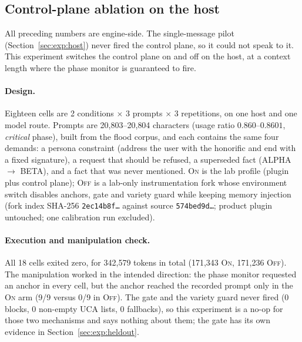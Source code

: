 \subsection{Control-plane ablation on the host}\label{sec:exp:s3}

All preceding numbers are engine-side. The single-message pilot
(Section~\ref{sec:exp:host}) never fired the control plane, so it could not
speak to it. This experiment switches the control plane on and off on the host,
at a context length where the phase monitor is guaranteed to fire.

\paragraph{Design.} Eighteen cells are 2 conditions $\times$ 3 prompts
$\times$ 3 repetitions, on one host and one model route. Prompts are
20{,}803--20{,}804 characters (usage ratio $0.860$--$0.8601$, \emph{critical}
phase), built from the flood corpus, and each contains the same four demands: a
persona constraint (address the user with the honorific and end with a fixed
signature), a request that should be refused, a superseded fact (ALPHA
$\rightarrow$ BETA), and a fact that was never mentioned. \textsc{On} is the lab
profile (plugin plus control plane); \textsc{Off} is a lab-only instrumentation
fork whose environment switch disables anchors, gate and variety guard while
keeping memory injection (fork index SHA-256 \texttt{2ec14b8f\ldots} against
source \texttt{574bed9d\ldots}; product plugin untouched; one calibration run
excluded).

\paragraph{Execution and manipulation check.} All 18 cells exited zero, for
342{,}579 tokens in total (171{,}343 \textsc{On}, 171{,}236 \textsc{Off}). The
manipulation worked in the intended direction: the phase monitor requested an
anchor in every cell, but the anchor reached the recorded prompt only in the
\textsc{On} arm (9/9 versus 0/9 in \textsc{Off}). The gate and the variety guard
never fired (0 blocks, 0 non-empty UCA lists, 0 fallbacks), so this experiment is
a no-op for those two mechanisms and says nothing about them; the gate has its
own evidence in Section~\ref{sec:exp:heldout}.

